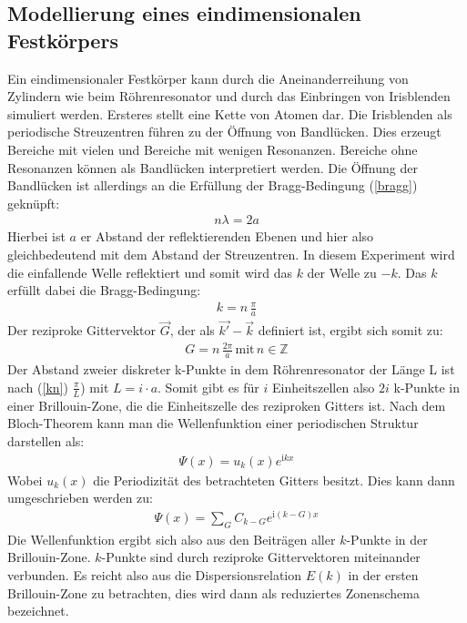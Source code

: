 \documentclass[german,  %
parskip=full,  %
]{scrartcl}
\begin{document}
\subsection{Modellierung eines eindimensionalen Festkörpers}
Ein eindimensionaler Festkörper kann durch die Aneinanderreihung von Zylindern wie beim Röhrenresonator und durch das Einbringen von Irisblenden simuliert werden. Ersteres stellt eine Kette von Atomen dar. Die Irisblenden als periodische Streuzentren führen zu der Öffnung von Bandlücken. Dies erzeugt Bereiche mit vielen und Bereiche mit wenigen Resonanzen. Bereiche ohne Resonanzen können als Bandlücken interpretiert werden. Die Öffnung der Bandlücken ist allerdings an die Erfüllung der Bragg-Bedingung (\ref{bragg}) geknüpft:
\begin{align}
\label{bragg} n\lambda=2a
\end{align}
Hierbei ist $a$ er Abstand der reflektierenden Ebenen und hier also gleichbedeutend mit dem Abstand der Streuzentren. In diesem Experiment wird die einfallende Welle reflektiert und somit wird das $k$ der Welle zu $-k$. Das $k$ erfüllt dabei die Bragg-Bedingung:
\begin{align}
\label{kn}k=n \, \frac{\pi}{a}
\end{align}
Der reziproke Gittervektor $\vec{G}$, der als $\vec{k'} - \vec{k}$ definiert ist, ergibt sich somit zu:
\begin{align}
G=n\,\frac{2\pi}{a} \, \text{mit} \, n \in \mathbb{Z}
\end{align}
Der Abstand zweier diskreter k-Punkte in dem Röhrenresonator der Länge L ist nach (\ref{kn}) $\frac{\pi}{L}$) mit $L=i\cdot a$. Somit gibt es für $i$ Einheitszellen also $2i$ k-Punkte in einer Brillouin-Zone, die die Einheitszelle des reziproken Gitters ist. Nach dem Bloch-Theorem kann man die Wellenfunktion einer periodischen Struktur darstellen als: 
\begin{align}
\label{bloch} \Psi(x)=u_{k}(x)e^{\mathrm{i} kx}
\end{align}
Wobei $u_k(x)$ die Periodizität des betrachteten Gitters besitzt. Dies kann dann umgeschrieben werden zu:
\begin{align}
\Psi(x)=\sum_{G} C_{k-G} e^{\mathrm{i}(k-G)x}
\end{align}
Die Wellenfunktion ergibt sich also aus den Beiträgen aller $k$-Punkte in der Brillouin-Zone. $k$-Punkte sind durch reziproke Gittervektoren miteinander verbunden. Es reicht also aus die Dispersionsrelation $E(k)$ in der ersten Brillouin-Zone zu betrachten, dies wird dann als reduziertes Zonenschema bezeichnet.
\end{document}
